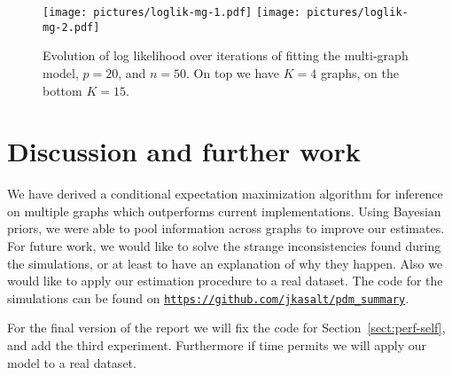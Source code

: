 \documentclass[a4paper, 11pt, oneside]{report}
\newcommand{\1}{\mathds{1}}
\begin{document}
\begin{figure}[ht]
	\begin{center}
		\texttt{[image: pictures/loglik-mg-1.pdf]}
		\texttt{[image: pictures/loglik-mg-2.pdf]}
		\hfill
	\end{center}
	\caption{Evolution of log likelihood over iterations of fitting the multi-graph model, $p=20$, and $n=50$. On top we have $K=4$ graphs, on the bottom $K=15$.}
	\label{fig:loglik-mg-1}
\end{figure}


\chapter{Discussion and further work}
We have derived a conditional expectation maximization algorithm for inference on multiple graphs
which outperforms current implementations. Using Bayesian priors, we were able to pool information across
graphs to improve our estimates.
For future work, we would like to solve the strange inconsistencies found during the simulations, or at
least to have an explanation of why they happen.
Also we would like to apply our estimation procedure to a real dataset.
The code for the simulations can be found on
\href{https://github.com/jkasalt/pdm_summary}{\texttt{https://github.com/jkasalt/pdm\_summary}}.

For the final version of the report we will fix the code for Section~\ref{sect:perf-self}, and add the third experiment. Furthermore if time permits we will apply our model to a real dataset.

\cleardoublepage
{}
{}
\printbibliography
\end{document}
